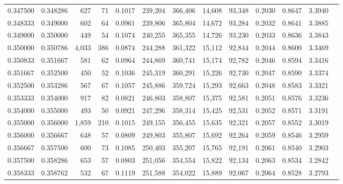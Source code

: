 \begin{tabular}{rrrrrrrrrrrrr}
0.347500 & 0.348286 &   627 &  71 &                                     0.1017 & 239,204 & 366,406 &  14,608 &  93,348 & 0.2030 & 0.8647 & 3.3940 \\
0.348333 & 0.349000 &   602 &  64 &                                     0.0961 & 239,806 & 365,804 &  14,672 &  93,284 & 0.2032 & 0.8641 & 3.3885 \\
0.349000 & 0.350000 &   449 &  54 &                                     0.1074 & 240,255 & 365,355 &  14,726 &  93,230 & 0.2033 & 0.8636 & 3.3843 \\
0.350000 & 0.350786 & 4,033 & 386 &                                     0.0874 & 244,288 & 361,322 &  15,112 &  92,844 & 0.2044 & 0.8600 & 3.3469 \\
0.350833 & 0.351667 &   581 &  62 &                                     0.0964 & 244,869 & 360,741 &  15,174 &  92,782 & 0.2046 & 0.8594 & 3.3416 \\
0.351667 & 0.352500 &   450 &  52 &                                     0.1036 & 245,319 & 360,291 &  15,226 &  92,730 & 0.2047 & 0.8590 & 3.3374 \\
0.352500 & 0.353286 &   567 &  67 &                                     0.1057 & 245,886 & 359,724 &  15,293 &  92,663 & 0.2048 & 0.8583 & 3.3321 \\
0.353333 & 0.354000 &   917 &  82 &                                     0.0821 & 246,803 & 358,807 &  15,375 &  92,581 & 0.2051 & 0.8576 & 3.3236 \\
0.354000 & 0.355000 &   493 &  50 &                                     0.0921 & 247,296 & 358,314 &  15,425 &  92,531 & 0.2052 & 0.8571 & 3.3191 \\
0.355000 & 0.356000 & 1,859 & 210 &                                     0.1015 & 249,155 & 356,455 &  15,635 &  92,321 & 0.2057 & 0.8552 & 3.3019 \\
0.356000 & 0.356667 &   648 &  57 &                                     0.0809 & 249,803 & 355,807 &  15,692 &  92,264 & 0.2059 & 0.8546 & 3.2959 \\
0.356667 & 0.357500 &   600 &  73 &                                     0.1085 & 250,403 & 355,207 &  15,765 &  92,191 & 0.2061 & 0.8540 & 3.2903 \\
0.357500 & 0.358286 &   653 &  57 &                                     0.0803 & 251,056 & 354,554 &  15,822 &  92,134 & 0.2063 & 0.8534 & 3.2842 \\
0.358333 & 0.358762 &   532 &  67 &                                     0.1119 & 251,588 & 354,022 &  15,889 &  92,067 & 0.2064 & 0.8528 & 3.2793 \\

\end{tabular}
